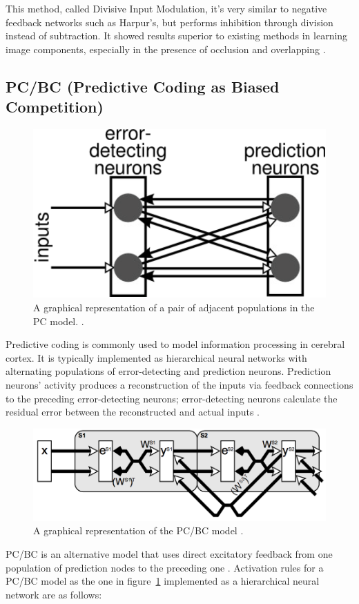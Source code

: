 \documentclass[a4paper,12pt]{article}
\begin{document}
		This method, called Divisive Input Modulation, it's very similar to negative feedback networks such as Harpur's, but performs inhibition through division instead of subtraction.
		It showed results superior to existing methods in learning image components, especially in the presence of occlusion and overlapping \cite{spratling2009unsupervised}.
		
	\subsection{PC/BC (Predictive Coding as Biased Competition)}
		\begin{figure}[H]
  			\centering
			\includegraphics[scale=0.6]{prediction}
			\caption{A graphical representation of a pair of adjacent populations in the PC model. \cite{spratling2014predictive}.}
		\end{figure}
		Predictive coding is commonly used to model information processing in cerebral cortex. It is typically implemented as hierarchical neural networks
		with alternating populations of error-detecting and prediction neurons. Prediction neurons' activity produces a reconstruction of the inputs
		via feedback connections to the preceding error-detecting neurons; error-detecting neurons calculate the residual error between
		the reconstructed and actual inputs \cite{spratling2014predictive}.
		\begin{figure}[H]
  			\centering
			\includegraphics[scale=0.4]{pcbc}
			\caption{A graphical representation of the PC/BC model \cite{spratling2008predictive}.}
			\label{fig:pcbc}
		\end{figure}
		PC/BC is an alternative model that uses direct excitatory feedback from one population of prediction nodes to the preceding one \cite{spratling2008predictive}.
		Activation rules for a PC/BC model as the one in figure~\ref{fig:pcbc} implemented as a hierarchical neural network are as follows:
		
\end{document}
